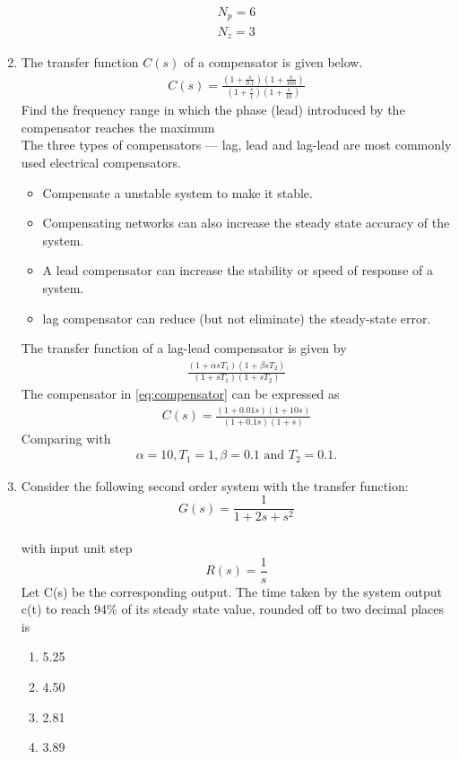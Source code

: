 \documentclass[journal,12pt,twocolumn]{IEEEtran}
\renewcommand\thesection{\arabic{section}}
\begin{document}
\begin{enumerate}[label=\arabic*.,ref=\thesection.\theenumi]
\begin{align}
N_{p} = 6 
\\ 
N_{z} = 3
\end{align}
%
\item 
The transfer function $C(s)$ of a compensator is given below.
\begin{align}
\label{eq:compensator}
C(s) = \frac{(1+\frac{s}{0.1})(1+\frac{s}{100})}{(1+\frac{s}{1})(1+\frac{s}{10})}
\end{align}
Find the frequency range in which the phase (lead) introduced by the compensator reaches the maximum
\\
\solution The three types of compensators — lag, lead and lag-lead are most commonly used electrical compensators.	
\begin{itemize}
    \item Compensate a unstable system to make it stable.
    \item Compensating networks can also increase the steady state accuracy of the system.
\item  A lead compensator can increase the stability or speed of response of a system. 
\item lag compensator can reduce (but not eliminate) the steady-state error.
\end{itemize}
\solution  The transfer function of a lag-lead compensator is given by
\begin{align}
\label{eq:compensator_lag_lead}
\frac{(1+ \alpha s T_1)(1+\beta s T_2)}{(1+ s T_1)(1+s T_2)}
\end{align}
The compensator in \eqref{eq:compensator} can be expressed as
%
\begin{align}
\label{eq:compensator_lag_lead_ex}
C(s) = \frac{(1+0.01 s)(1+10 s)}{(1+ 0.1 s)(1+ s)}
\end{align}
%
Comparing \label{eq:compensator_lag_lead_ex} with \label{eq:compensator_lag_lead}
\begin{align}
\alpha = 10 , T_1 = 1 , \beta = 0.1 \text{ and }  T_2 = 0.1 .
\end{align}




\item
Consider the following second order system with the transfer function:
$$G(s) = \frac{1}{1+2s+s^2}$$
\\with input unit step $$R(s) = \frac{1}{s}$$  Let C(s) be the corresponding output. The time taken by the system output c(t) to reach 94\% of its steady state value, rounded off to two decimal places is
\begin{enumerate}
\item 5.25
\item 4.50
\item 2.81
\item 3.89
\end{enumerate}




\end{enumerate}
\end{document}
